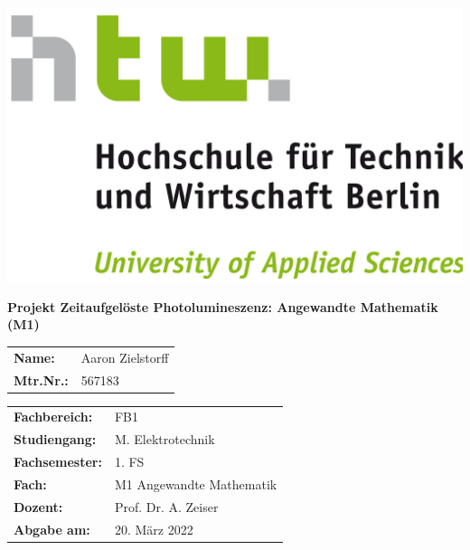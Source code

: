 \documentclass[
	pagesize,
	fontsize=12pt,
	paper=a4,
	oneside,
   reqno
]{scrartcl}
\begin{document}
\begin{titlepage}
   \pagestyle{empty} %

   \begin{flushright}
   \includegraphics[scale=.07]{Bilder/LogoHTWBerlin.png}  \nocite{HTWgross}
   \end{flushright}

   \vspace{1cm}

   \begin{center}
      \Huge{\textbf{Projekt Zeitaufgelöste Photolumineszenz: 
      Angewandte Mathematik (M1)}} \\
   \end{center}

   \vspace{3cm}

   \begin{flushleft}
      \begin{tabular}{l l}
         \textbf{Name:}    & Aaron Zielstorff   \\
         \textbf{Mtr.Nr.:} & 567183             \\
      \end{tabular}
   \end{flushleft}

   \vspace{1cm}

   \begin{tabular}{l l}
      \textbf{Fachbereich:}   & FB1                                              \\
      \textbf{Studiengang:}   & M.\xspace Elektrotechnik                         \\
      \textbf{Fachsemester:}  & 1.\xspace FS                                     \\
      \textbf{Fach:}          & M1 Angewandte Mathematik                         \\
      \textbf{Dozent:}        & Prof.\xspace Dr.\xspace A.\xspace Zeiser         \\
      \textbf{Abgabe am:}     & 20.\xspace März 2022                             \\ 
   \end{tabular}
\end{titlepage}
\clearpage
\end{document}
